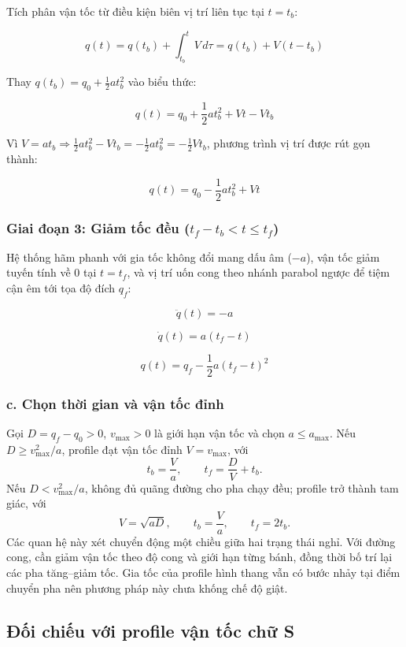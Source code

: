 \documentclass[12pt,a4paper,oneside]{report}
\begin{document}
Tích phân vận tốc từ điều kiện biên vị trí liên tục tại \(t=t_{b}\):

\[
q\left( t \right)=q\left( t_{b} \right)+\int_{t_{b}}^{t} V\,d\tau =q\left( t_{b} \right)+V\left( t-t_{b} \right)
\]

Thay \(q\left( t_{b} \right)=q_{0}+\frac{1}{2}at_{b}^{2}\) vào biểu thức:

\[
q\left( t \right)=q_{0}+\frac{1}{2}at_{b}^{2}+Vt-Vt_{b}
\]

Vì \(V=at_{b}\Longrightarrow \frac{1}{2}at_{b}^{2}-Vt_{b}=-\frac{1}{2}at_{b}^{2}=-\frac{1}{2}Vt_{b}\), phương trình vị trí được rút gọn thành:

\[
q\left( t \right)=q_{0}-\frac{1}{2}at_{b}^{2}+Vt
\]

\subsubsection*{Giai đoạn 3: Giảm tốc đều (\(t_{f}-t_{b}<t\leq t_{f}\))}

Hệ thống hãm phanh với gia tốc không đổi mang dấu âm (\(-a\)), vận tốc giảm tuyến tính về 0 tại \(t=t_{f}\), và vị trí uốn cong theo nhánh parabol ngược để tiệm cận êm tới tọa độ đích \(q_{f}\):

\[
\ddot{q}\left( t \right)=-a
\]

\[
\dot{q}\left( t \right)=a\left( t_{f}-t \right)
\]

\[
q\left( t \right)=q_{f}-\frac{1}{2}a{\left( t_{f}-t \right)}^{2}
\]

\subsubsection*{c. Chọn thời gian và vận tốc đỉnh}

Gọi \(D=q_f-q_0>0\), \(v_{\max}>0\) là giới hạn vận tốc và chọn \(a\leq a_{\max}\). Nếu \(D\geq v_{\max}^2/a\), profile đạt vận tốc đỉnh \(V=v_{\max}\), với
\[
  t_b=\frac{V}{a},\qquad
  t_f=\frac{D}{V}+t_b.
\]
Nếu \(D<v_{\max}^2/a\), không đủ quãng đường cho pha chạy đều; profile trở thành tam giác, với
\[
  V=\sqrt{aD},\qquad t_b=\frac{V}{a},\qquad t_f=2t_b.
\]
Các quan hệ này xét chuyển động một chiều giữa hai trạng thái nghỉ. Với đường cong, cần giảm vận tốc theo độ cong và giới hạn từng bánh, đồng thời bố trí lại các pha tăng--giảm tốc. Gia tốc của profile hình thang vẫn có bước nhảy tại điểm chuyển pha nên phương pháp này chưa khống chế độ giật.

\subsection{Đối chiếu với profile vận tốc chữ S}
\end{document}
